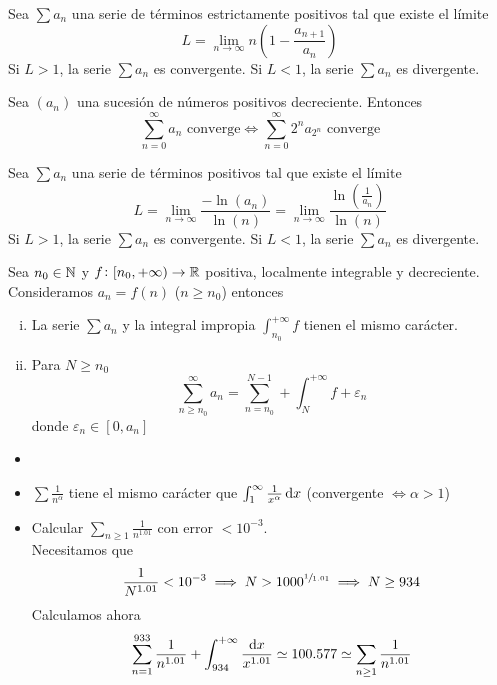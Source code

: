\begin{prop}
	Sea $\sum a_n$ una serie de términos estrictamente positivos tal que existe el límite
	\[
		L = \lim_{n \to \infty} n\left( 1 - \frac{a_{n+1}}{a_n} \right)
	\]
	Si $L > 1$, la serie $\sum a_n$ es convergente. Si $L < 1$, la serie $\sum a_n$ es
	divergente.
\end{prop}

\begin{prop*}
	Sea $(a_n)$ una sucesión de números positivos decreciente. Entonces
	\[
		\sum_{n=0}^{\infty} a_n \text{ converge} \iff \sum_{n=0}^{\infty} 2^n a_{2^n}
		\text{ converge}
	\]
\end{prop*}

\begin{prop*}
	Sea $\sum a_n$ una serie de términos positivos tal que existe el límite
	\[
		L = \lim_{n \to \infty} \frac{- \ln(a_n)}{\ln(n)} = \lim_{n \to \infty}
		\frac{\ln\left( \frac{1}{a_n} \right)}{\ln(n)}
	\]
	Si $L > 1$, la serie $\sum a_n$ es convergente. Si $L < 1$, la serie $\sum a_n$ es
	divergente.
\end{prop*}

\begin{prop}
	Sea $n_0 \in \mathbb{N}$ y $f \colon [n_0, +\infty) \to \mathbb{R}$ positiva, localmente integrable
	y decreciente. Consideramos $a_n = f(n)$ ($n \geq n_0$) entonces
	\begin{enumerate}[i)]
		\item La serie $\sum a_n$ y la integral impropia
		$\int_{n_0}^{+\infty} f$ tienen el mismo carácter.
		\item Para $N \geq n_0$
		\[
			\sum_{n \geq n_0}^{\infty} a_n = \sum_{n = n_0}^{N-1} + \int_{N}^{+\infty}f +
			\varepsilon_n
		\]
		donde $\varepsilon_n \in [0, a_n]$
	\end{enumerate}
\end{prop}

\begin{example*}
	\begin{itemize}
		\item[]
		\item $\sum \frac{1}{n^\alpha}$ tiene el mismo carácter que
			$\int_{1}^{\infty} \frac{1}{x^\alpha} \dif x$ (convergente $\iff \alpha > 1$)
		\item Calcular $\sum\limits_{n\geq 1} \frac{1}{n^{1.01}}$ con error $< 10^{-3}$. \\
			Necesitamos que
			\[
				\frac{1}{N^{1.01}} < 10^{-3} \implies N > 1000^{\sfrac{1}{1.01}} \implies
				N \geq 934
			\]
			Calculamos ahora
			\[
				\sum_{n=1}^{933} \frac{1}{n^{1.01}} + \int_{934}^{+\infty}
				\frac{\dif x}{x^{1.01}} \simeq 100.577 \simeq\sum_{n\geq 1}\frac{1}{n^{1.01}}
			\]
	\end{itemize}
\end{example*}

